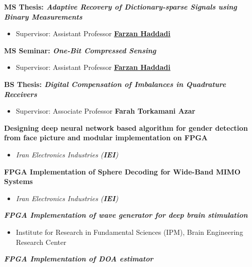 \documentclass[a4paper]{resume}
\begin{document}
\begin{resume}
\textbf{MS Thesis: \emph{Adaptive Recovery of Dictionary-sparse Signals using Binary Measurements}}
\begin{itemize}
	\item Supervisor: Assistant Professor {\href{http://www.iust.ac.ir/find.php?item=35.11222.21095.en}{\color{black}\textbf{Farzan Haddadi}}}
\end{itemize}

\textbf{MS Seminar: \emph{One-Bit Compressed Sensing}}
\begin{itemize}
\item Supervisor: Assistant Professor {\href{http://www.iust.ac.ir/find.php?item=35.11222.45110.en}{\color{black}\textbf{Farzan Haddadi}}}
\end{itemize}

\textbf{BS Thesis: \emph{Digital Compensation of
Imbalances in Quadrature Receivers}}
\begin{itemize}
\item {Supervisor:} Associate Professor {\textbf{Farah Torkamani Azar}}
\end{itemize}


\textbf{Designing deep neural network based algorithm for gender detection from face picture and modular implementation on FPGA }
\begin{itemize}
	\item \emph{Iran Electronics Industries ({\color{black}\textbf{IEI}})}
\end{itemize}

\textbf{FPGA Implementation of Sphere Decoding for Wide-Band MIMO Systems}
\begin{itemize}
	\item \emph{Iran Electronics Industries ({\color{black}\textbf{IEI}})}
\end{itemize}

\textbf{\emph{FPGA Implementation of wave generator for deep brain stimulation}}
\begin{itemize}
	\item Institute for Research in Fundamental Sciences  (IPM), Brain Engineering Research Center 
\end{itemize}

\textbf{\emph{FPGA Implementation of DOA estimator}}


\end{resume}
\end{document}
